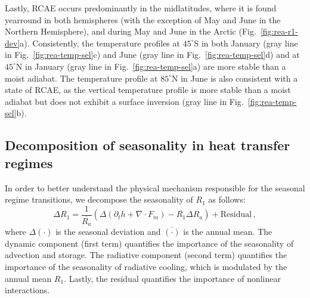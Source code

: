 \documentclass{ametsocV5}
\begin{document}
    Lastly, RCAE occurs predominantly in the midlatitudes, where it is found yearround in both hemispheres (with the exception of May and June in the Northern Hemisphere), and during May and June in the Arctic (Fig.~\ref{fig:rea-r1-dev}a). Consistently, the temperature profiles at $45^\circ$S in both January (gray line in Fig.~\ref{fig:rea-temp-sel}c) and June (gray line in Fig.~\ref{fig:rea-temp-sel}d) and at $45^\circ$N in January (gray line in Fig.~\ref{fig:rea-temp-sel}a) are more stable than a moist adiabat. The temperature profile at $85^\circ$N in June is also consistent with a state of RCAE, as the vertical temperature profile is more stable than a moist adiabat but does not exhibit a surface inversion (gray line in Fig.~\ref{fig:rea-temp-sel}b).


    \subsection{Decomposition of seasonality in heat transfer regimes}

    In order to better understand the physical mechanism responsible for the seasonal regime transitions, we decompose the seasonality of $R_1$ as follows:
    \begin{equation}\label{eq:r1-dev}
      \Delta R_1 = \frac{1}{\overline{R_a}}\left( \Delta(\partial_t h + \nabla\cdot F_m)  - \overline{R_1} \Delta R_a \right) + \mathrm{Residual} \, ,
    \end{equation}
    where $\Delta(\cdot)$ is the seasonal deviation and $\overline{(\cdot)}$ is the annual mean. The dynamic component (first term) quantifies the importance of the seasonality of advection and storage. The radiative component (second term) quantifies the importance of the seasonality of radiative cooling, which is modulated by the annual mean $R_1$. Lastly, the residual quantifies the importance of nonlinear interactions.
\end{document}
